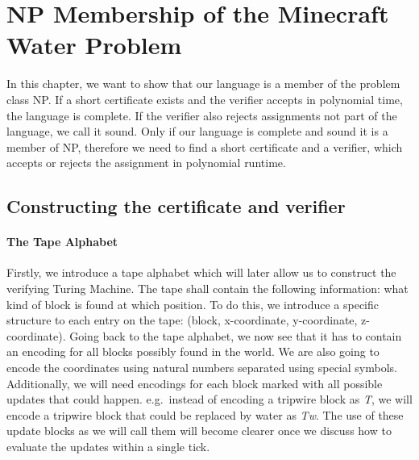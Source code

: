 \section{NP Membership of the Minecraft Water Problem}
	In this chapter, we want to show that our language is a member of the problem class NP. If a short certificate exists and the verifier accepts in polynomial time, the language is complete. If the verifier also rejects assignments not part of the language, we call it sound. Only if our language is complete and sound it is a member of NP, therefore we need to find a short certificate and a verifier, which accepts or rejects the assignment in polynomial runtime.
	
	\subsection{Constructing the certificate and verifier}
	\paragraph{The Tape Alphabet}
	Firstly, we introduce a tape alphabet which will later allow us to construct the verifying Turing Machine. 
	The tape shall contain the following information: what kind of block is found at which position.
	To do this, we introduce a specific structure to each entry on the tape: (block, x-coordinate, y-coordinate, z-coordinate).
	Going back to the tape alphabet, we now see that it has to contain an encoding for all blocks possibly found in the world.
	We are also going to encode the coordinates using natural numbers separated using special symbols.
	Additionally, we will need encodings for each block marked with all possible updates that could happen. 
	e.g.\ instead of encoding a tripwire block as \emph{T}, we will encode a tripwire block that could be replaced by water as \emph{Tw}.
	The use of these update blocks as we will call them will become clearer once we discuss how to evaluate the updates within a single tick.


